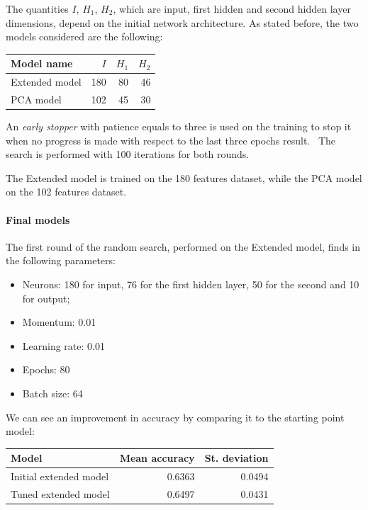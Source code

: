 The quantities $I$, $H_1$, $H_2$, which are input, first hidden and second hidden 
layer dimensions, depend on the initial network architecture.
As stated before, the two models considered are the following: 
\begin{center}
    \begin{tabular}{ |l|r|r|r|} 
        \hline
        Model name & $I$ & $H_1$ & $H_2$ \\
        \hline
        Extended model & 180 & 80 & 46 \\
        PCA model & 102 & 45 & 30 \\
        \hline
    \end{tabular}
\end{center}

An \emph{early stopper} with patience equals to three is used on the training to stop it when no progress is made with 
respect to the last three epochs result.~\cite{early}
The search is performed with 100 iterations for both rounds.

The Extended model is trained on the 180 features dataset, 
while the PCA model on the 102 features dataset.

\paragraph{Final models}
The first round of the random search, performed on the Extended model, finds 
in the following parameters:
\begin{itemize}
    \item Neurons: 180 for input, 76 for the first hidden layer, 50 for the second and 10 for output;
    \item Momentum: 0.01
    \item Learning rate: 0.01
    \item Epochs: 80
    \item Batch size: 64
\end{itemize}
We can see an improvement in accuracy by comparing it to the starting point model:
\begin{center}
    \begin{tabular}{ |l|r|r| } 
        \hline
        Model & Mean accuracy & St. deviation \\
        \hline
        Initial extended model & 0.6363 & 0.0494\\
        Tuned extended model & 0.6497 & 0.0431\\
        \hline
    \end{tabular}
\end{center}

